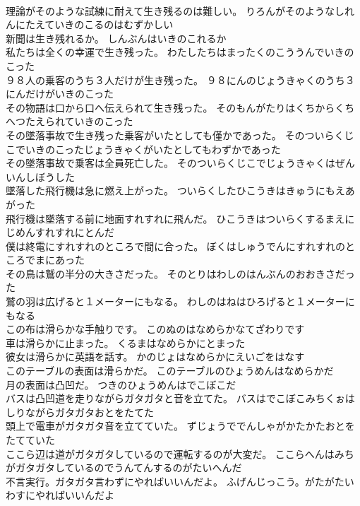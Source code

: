 \documentclass[8pt]{extreport}
\begin{document}
\begin{CJK}{UTF8}{min}
\\	理論がそのような試練に耐えて生き残るのは難しい。	りろんがそのようなしれんにたえていきのこるのはむずかしい 
\\	新聞は生き残れるか。	しんぶんはいきのこれるか 
\\	私たちは全くの幸運で生き残った。	わたしたちはまったくのこううんでいきのこった 
\\	９８人の乗客のうち３人だけが生き残った。	９８にんのじょうきゃくのうち３にんだけがいきのこった 
\\	その物語は口から口へ伝えられて生き残った。	そのもんがたりはくちからくちへつたえられていきのこった 
\\	その墜落事故で生き残った乗客がいたとしても僅かであった。	そのついらくじこでいきのこったじょうきゃくがいたとしてもわずかであった 
\\	その墜落事故で乗客は全員死亡した。	そのついらくじこでじょうきゃくはぜんいんしぼうした 
\\	墜落した飛行機は急に燃え上がった。	ついらくしたひこうきはきゅうにもえあがった 
\\	飛行機は墜落する前に地面すれすれに飛んだ。	ひこうきはついらくするまえにじめんすれすれにとんだ 
\\	僕は終電にすれすれのところで間に合った。	ぼくはしゅうでんにすれすれのところでまにあった 
\\	その鳥は鷲の半分の大きさだった。	そのとりはわしのはんぶんのおおきさだった 
\\	鷲の羽は広げると１メーターにもなる。	わしのはねはひろげると１メーターにもなる 
\\	この布は滑らかな手触りです。	このぬのはなめらかなてざわりです 
\\	車は滑らかに止まった。	くるまはなめらかにとまった 
\\	彼女は滑らかに英語を話す。	かのじょはなめらかにえいごをはなす 
\\	このテーブルの表面は滑らかだ。	このテーブルのひょうめんはなめらかだ 
\\	月の表面は凸凹だ。	つきのひょうめんはでこぼこだ 
\\	バスは凸凹道を走りながらガタガタと音を立てた。	バスはでこぼこみちくぉはしりながらガタガタおとをたてた 
\\	頭上で電車がガタガタ音を立てていた。	ずじょうででんしゃがかたかたおとをたてていた 
\\	ここら辺は道がガタガタしているので運転するのが大変だ。	ここらへんはみちがガタガタしているのでうんてんするのがたいへんだ 
\\	不言実行。ガタガタ言わずにやればいいんだよ。	ふげんじっこう。がたがたいわすにやればいいんだよ 

\end{CJK}
\end{document}
